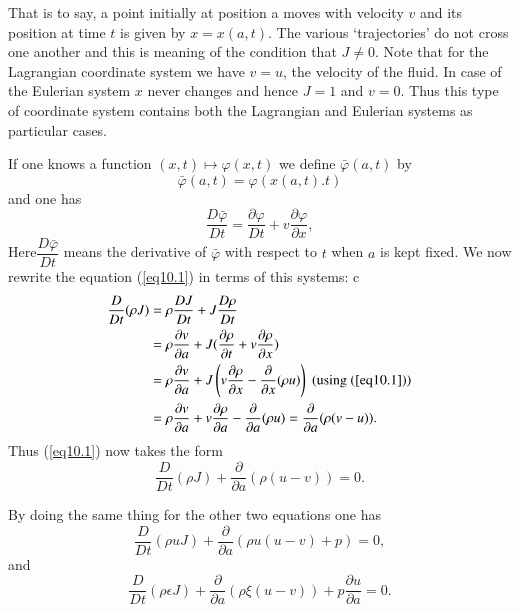 That is to say, a point initially at position a moves with velocity $v$ and its position at time $t$ is given by $x=x(a,t)$. The various `trajectories' do not cross one another and this is meaning of the condition that $J \neq 0$. Note that for the Lagrangian coordinate system we have $v = u$, the velocity of the fluid. In case of the Eulerian system $x$ never changes and hence $J=1$ and $v=0$. Thus this type of coordinate system contains both the Lagrangian and Eulerian systems as particular cases.

If one knows a function $(x,t) \mapsto \varphi(x,t)$ we define $\bar{\varphi} (a,t)$ by 
\begin{equation*}
\bar{\varphi} (a,t) = \varphi (x(a,t).t)\tag{10.21}\label{eq10.21}
\end{equation*}
and one has 
\begin{equation*}
\frac{D\bar{\varphi}}{Dt} = \frac{\partial \varphi}{Dt} + v \frac{\partial \varphi}{\partial x}, \tag{10.22}\label{eq10.22}
\end{equation*}
Here\pageoriginale $\dfrac{D\bar{\varphi}}{Dt}$ means the derivative
of $\bar{\varphi}$ with respect to $t$ when $a$ is kept fixed. We now
rewrite the equation (\ref{eq10.1}) in terms of this systems: c
\begin{align*}
\frac{D}{Dt} (\rho J) & = \rho \frac{DJ}{Dt} + J \frac{D\rho}{Dt}\\
& = \rho \frac{\partial v}{\partial a} + J (\frac{\partial
  \rho}{\partial t} + v \frac{\partial \rho}{\partial x})\\ 
& =  \rho \frac{\partial v}{\partial a} + J \left(v \frac{\partial
  \rho}{\partial x} - \frac{\partial}{\partial x} (\rho u)\right) \;
(\text{using (\ref{eq10.1})})\\ 
& = \rho \frac{\partial v}{\partial a} + v \frac{\partial
  \rho}{\partial a} - \frac{\partial}{\partial a} (\rho u) =
\frac{\partial}{\partial a} (\rho (v-u)). 
\end{align*}
Thus (\ref{eq10.1}) now takes the form 
\begin{equation*}
\frac{D}{Dt} (\rho J) + \frac{\partial}{\partial a} (\rho (u-v)) = 0.
\tag{10.23}\label{eq10.23}
\end{equation*}

By doing the same thing for the other two equations one has 
\begin{equation*}
\frac{D}{Dt} (\rho u J) + \frac{\partial}{\partial a} (\rho u (u-v) + p) = 0,
\tag{10.24}\label{eq10.24}
\end{equation*}
and
\begin{equation*}
\frac{D}{Dt} (\rho \epsilon J) + \frac{\partial}{\partial a} (\rho \xi (u-v)) + p \frac{\partial u}{\partial a} = 0. \tag{10.25}\label{eq10.25}
\end{equation*}

